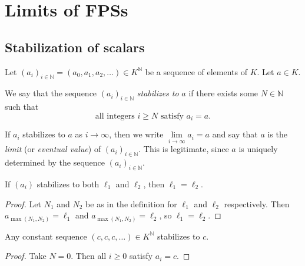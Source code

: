 \section{Limits of FPSs}

\subsection{Stabilization of scalars}

\begin{definition}
\label{def.fps.lim.stab}
\leantarget
\leanok
Let $\left(  a_{i}\right)  _{i\in\mathbb{N}}=\left(
a_{0},a_{1},a_{2},\ldots\right)  \in K^{\mathbb{N}}$ be a sequence of elements
of $K$. Let $a\in K$.

We say that the sequence $\left(  a_{i}\right)  _{i\in\mathbb{N}}$
\emph{stabilizes to }$a$ if there exists some $N\in\mathbb{N}$ such that%
\[
\text{all integers }i\geq N\text{ satisfy }a_{i}=a.
\]

If $a_{i}$ stabilizes to $a$ as $i\rightarrow\infty$, then we write
$\lim\limits_{i\rightarrow\infty}a_{i}=a$ and say that $a$ is the \emph{limit}
(or \emph{eventual value}) of $\left(  a_{i}\right)  _{i\in\mathbb{N}}$.
This is legitimate, since $a$ is uniquely determined by the sequence
$\left(  a_{i}\right)  _{i\in\mathbb{N}}$.
\end{definition}

\begin{lemma}
\label{lem.fps.lim.stab-unique}
\leanhelper
\leanok
If $\left(  a_{i}\right)$ stabilizes to both $\ell_{1}$ and $\ell_{2}$,
then $\ell_{1}=\ell_{2}$.
\end{lemma}

\begin{proof}
\leanok
Let $N_{1}$ and $N_{2}$ be as in the definition for $\ell_{1}$ and $\ell_{2}$
respectively. Then $a_{\max(N_{1},N_{2})}=\ell_{1}$ and
$a_{\max(N_{1},N_{2})}=\ell_{2}$, so $\ell_{1}=\ell_{2}$.
\end{proof}

\begin{lemma}
\label{lem.fps.lim.stab-const}
\leanhelper
\leanok
Any constant sequence $\left(  c,c,c,\ldots\right)  \in K^{\mathbb{N}}$
stabilizes to $c$.
\end{lemma}

\begin{proof}
\leanok
Take $N=0$. Then all $i\geq 0$ satisfy $a_{i}=c$.
\end{proof}

